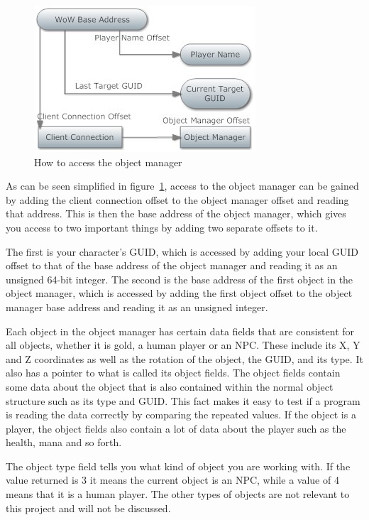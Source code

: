 \begin{figure}[htbp]  %
\centering
\includegraphics[scale = 0.65]{objmanonly.jpg}	
\caption{How to access the object manager}
\label{datastruct}
\end{figure}


As can be seen simplified in figure~\ref{datastruct}, access to the object manager can be gained by adding the client connection offset to the object manager offset and reading that address. This is then the base address of the object manager, which gives you access to two important things by adding two separate offsets to it. 

The first is your character's GUID, which is accessed by adding your local GUID offset to that of the base address of the object manager and reading it as an unsigned 64-bit integer.
The second is the base address of the first object in the object manager, which is accessed by adding the first object offset to the object manager base address and reading it as an unsigned integer.

Each object in the object manager has certain data fields that are consistent for all objects, whether it is gold, a human player or an NPC. These include its X, Y and Z coordinates as well as the rotation of the object, the GUID, and its type. It also has a pointer to what is called its object fields. The object fields contain some data about the object that is also contained within the normal object structure such as its type and GUID. This fact makes it easy to test if a program is reading the data correctly by comparing the repeated values. If the object is a player, the object fields also contain a lot of data about the player such as the health, mana and so forth.

The object type field tells you what kind of object you are working with. If the value returned is 3 it means the current object is an NPC, while a value of 4 means that it is a human player. The other types of objects are not relevant to this project and will not be discussed. 

